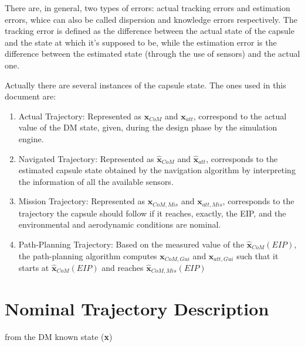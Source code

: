 There are, in general, two types of errors: actual tracking errors and estimation
errors, whice can also be called dispersion and knowledge errors respectively.
The tracking error is defined as the difference between the actual state of the capsule and the state
at which it's supposed to be, while the estimation error is the difference between the estimated state
(through the use of sensors) and the actual one.

Actually there are several instances of the capsule state. The ones used in this document are:

\begin{enumerate}
    \item Actual Trajectory: Represented as $\textbf{x}_{CoM}$ and $\textbf{x}_{att}$, correspond
    to the actual value of the DM state, given, during the design phase by the simulation engine.
    \item Navigated Trajectory: Represented as $\hat{\textbf{x}}_{CoM}$ and $\hat{\textbf{x}}_{att}$,
    corresponds to the estimated capsule state obtained by the navigation algorithm by interpreting the
    information of all the available sensors.
    \item Mission Trajectory: Represented as $\textbf{x}_{CoM,Mis}$ and $\textbf{x}_{att,Mis}$, corresponds to the trajectory
    the capsule should follow if it reaches, exactly, the EIP, and the environmental and aerodynamic conditions are nominal.
    \item Path-Planning Trajectory: Based on the measured value of the $\hat{\textbf{x}}_{CoM}(EIP)$, the path-planning 
    algorithm computes $\textbf{x}_{CoM,Gui}$ and $\textbf{x}_{att,Gui}$ such that it starts at $\hat{\textbf{x}}_{CoM}(EIP)$ and
    reaches $\hat{\textbf{x}}_{CoM,Mis}(EIP)$ 
\end{enumerate}

\newpage

\section{Nominal Trajectory Description}

from the DM known state (\textbf{x})